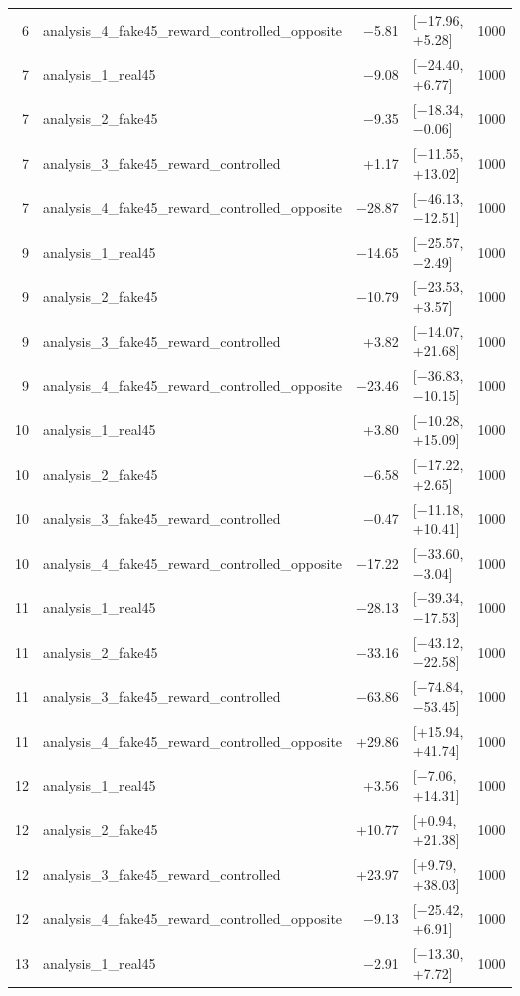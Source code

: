 \begin{table}[htbp]
\begin{tabular}{rlrlr}
    6 & analysis\_4\_fake45\_reward\_controlled\_opposite & −5.81 & [−17.96, +5.28] & 1000 \\
    7 & analysis\_1\_real45 & −9.08 & [−24.40, +6.77] & 1000 \\
    7 & analysis\_2\_fake45 & −9.35 & [−18.34, −0.06] & 1000 \\
    7 & analysis\_3\_fake45\_reward\_controlled & +1.17 & [−11.55, +13.02] & 1000 \\
    7 & analysis\_4\_fake45\_reward\_controlled\_opposite & −28.87 & [−46.13, −12.51] & 1000 \\
    9 & analysis\_1\_real45 & −14.65 & [−25.57, −2.49] & 1000 \\
    9 & analysis\_2\_fake45 & −10.79 & [−23.53, +3.57] & 1000 \\
    9 & analysis\_3\_fake45\_reward\_controlled & +3.82 & [−14.07, +21.68] & 1000 \\
    9 & analysis\_4\_fake45\_reward\_controlled\_opposite & −23.46 & [−36.83, −10.15] & 1000 \\
    10 & analysis\_1\_real45 & +3.80 & [−10.28, +15.09] & 1000 \\
    10 & analysis\_2\_fake45 & −6.58 & [−17.22, +2.65] & 1000 \\
    10 & analysis\_3\_fake45\_reward\_controlled & −0.47 & [−11.18, +10.41] & 1000 \\
    10 & analysis\_4\_fake45\_reward\_controlled\_opposite & −17.22 & [−33.60, −3.04] & 1000 \\
    11 & analysis\_1\_real45 & −28.13 & [−39.34, −17.53] & 1000 \\
    11 & analysis\_2\_fake45 & −33.16 & [−43.12, −22.58] & 1000 \\
    11 & analysis\_3\_fake45\_reward\_controlled & −63.86 & [−74.84, −53.45] & 1000 \\
    11 & analysis\_4\_fake45\_reward\_controlled\_opposite & +29.86 & [+15.94, +41.74] & 1000 \\
    12 & analysis\_1\_real45 & +3.56 & [−7.06, +14.31] & 1000 \\
    12 & analysis\_2\_fake45 & +10.77 & [+0.94, +21.38] & 1000 \\
    12 & analysis\_3\_fake45\_reward\_controlled & +23.97 & [+9.79, +38.03] & 1000 \\
    12 & analysis\_4\_fake45\_reward\_controlled\_opposite & −9.13 & [−25.42, +6.91] & 1000 \\
    13 & analysis\_1\_real45 & −2.91 & [−13.30, +7.72] & 1000 \\

\end{tabular}
\end{table}
